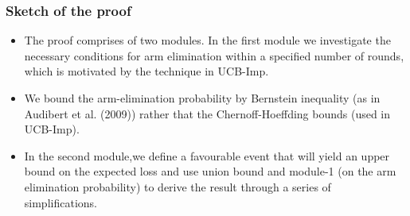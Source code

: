 \begin{frame}
\frametitle{Sketch of the proof}
\begin{itemize}
\item<1-> The proof comprises of two modules. In the first module we investigate the necessary conditions for arm elimination within a specified number of rounds, which is motivated by the technique in UCB-Imp. 
 
\item<2-> We bound the arm-elimination probability by Bernstein inequality (as in {Audibert et al. (2009)}) rather that the Chernoff-Hoeffding bounds (used in UCB-Imp). 

\item<3-> In the second module,we define a favourable event that will yield an upper bound on the expected loss and use union bound and module-1 (on the arm elimination probability) to derive the result through a series of simplifications.
\end{itemize}

\end{frame}



